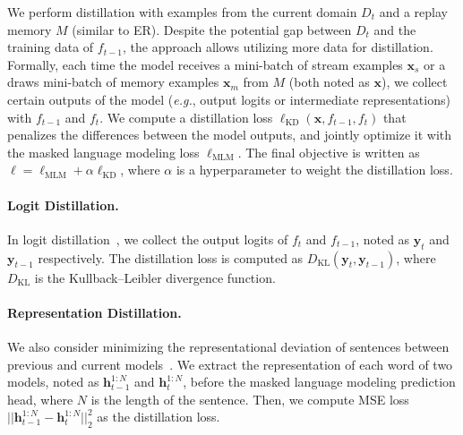 We perform distillation with examples from the current domain $D_{t}$ and a replay memory $M$ (similar to ER). 
Despite the potential gap between $D_{t}$ and the training data of $f_{t-1}$, the approach allows utilizing more data for distillation. Formally,  
each time the model receives a mini-batch of stream examples $\bm{x}_s$ or a draws mini-batch of memory examples $\bm{x}_m$ from $M$ (both noted as $\bm{x}$), we collect certain outputs of the model (\textit{e.g.}, output logits or intermediate representations) with $f_{t-1}$ and $f_t$. 
We compute a distillation loss $\ell_{\textrm{KD}}(\bm{x}, f_{t-1}, f_t)$ that penalizes the differences between the model outputs, and jointly optimize it with the masked language modeling loss $\ell_{\textrm{MLM}}$. The final objective is written as $\ell = \ell_{\textrm{MLM}} + \alpha\ell_{\textrm{KD}}$, where $\alpha$ is a hyperparameter to weight the distillation loss. %


\paragraph{Logit Distillation.} In logit distillation~\cite{Hinton2015DistillingTK}, we collect the output logits of $f_t$ and $f_{t-1}$, noted as $\bm{y}_t$ and $\bm{y}_{t-1}$ respectively. The distillation loss is computed as 
$D_{\textrm{KL}}(\bm{y}_t, \bm{y}_{t-1})$, where $D_{\textrm{KL}}$ is the Kullback–Leibler divergence function.

\paragraph{Representation Distillation.} 
We also consider minimizing the representational deviation of sentences between previous and current models~\cite{Sun2019PatientKD, Jiao2020TinyBERTDB}. We extract the representation of each word of two models, noted as $\bm{h}_{t-1}^{1:N}$ and $\bm{h}_{t}^{1:N}$, before the masked language modeling prediction head, where $N$ is the length of the sentence. Then, we compute MSE loss $\vert\vert \bm{h}_{t-1}^{1:N} -  \bm{h}_{t}^{1:N} \vert\vert_2^2$ as the distillation loss.


